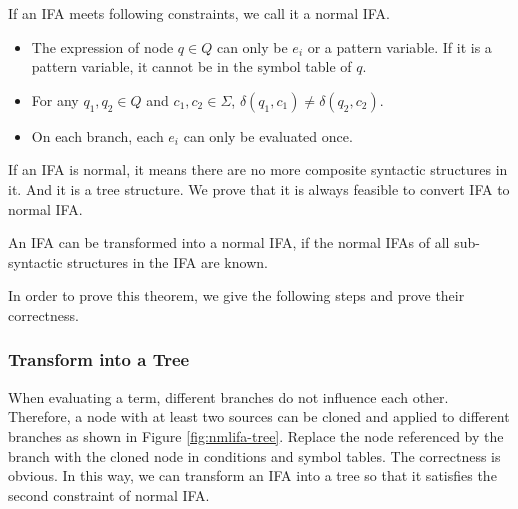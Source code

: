 \begin{Def}
\label{def:nmlifa}
If an IFA meets following constraints, we call it a normal IFA.
\begin{itemize}
    \item The expression of node $q \in Q$ can only be $e_i$ or a pattern variable. If it is a pattern variable, it cannot be in the symbol table of $q$.
    \item For any $q_1,q_2 \in Q$ and $c_1, c_2 \in \Sigma$, $\delta(q_1, c_1) \neq \delta(q_2, c_2)$.
    \item On each branch, each $e_i$ can only be evaluated once.
\end{itemize}
\end{Def}

If an IFA is normal, it means there are no more composite syntactic structures in it. And it is a tree structure. We  prove that it is always feasible to convert IFA to normal IFA.

\begin{mythm}
\label{mythm:nmlifa}
An IFA can be transformed into a normal IFA, if the normal IFAs of all sub-syntactic structures in the IFA are known.
\end{mythm}

In order to prove this theorem, we give the following steps and prove their correctness.

\subsubsection{Transform into a Tree}

When evaluating a term, different branches do not influence each other. Therefore, a node with at least two sources can be cloned and applied to different branches as shown in Figure \ref{fig:nmlifa-tree}. Replace the node referenced by the branch with the cloned node in conditions and symbol tables. The correctness is obvious. In this way, we can transform an IFA into a tree so that it satisfies the second constraint of normal IFA.

